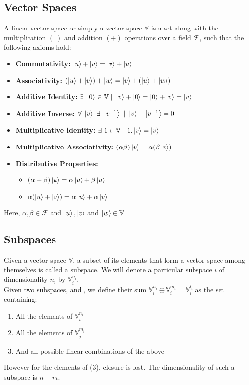 \subsection{Vector Spaces}
A linear vector space or simply a vector space $\mathbb{V}$ is a set along with the multiplication $(.)$ and addition $(+)$ operations over a field $\mathcal{F}$, such that the following axioms hold:
\begin{itemize}
	\item \textbf{Commutativity:} $\ket{u} + \ket{v} = \ket{v} + \ket{u}$
	\item \textbf{Associativity:} $(\ket{u} + \ket{v}) + \ket{w} = \ket{v} + (\ket{u} + \ket{w})$
	\item \textbf{Additive Identity:} 
	$\exists \  \ket{0} \in \mathbb{V} \ | \ \ket{v} + \ket{0} = \ket{0} + \ket{v} = \ket{v}$
	\item \textbf{Additive Inverse:} $\forall \ \ket{v} \ \exists \ \ket{v^{-1}} \ | \ \ket{v} + \ket{v^{-1}} = 0$
	\item \textbf{Multiplicative identity:} $\exists \ 1 \in \mathbb{V} \ | \ 1 .\ket{v} = \ket{v}$
	\item \textbf{Multiplicative Associativity:}  $(\alpha \beta) \ket{v} = \alpha (\beta \ket{v})$
	\item \textbf{Distributive Properties:} 
	\begin{itemize}
		\item $(\alpha + \beta) \ket{u} = \alpha \ket{u} + \beta \ket{u}$
		\item $\alpha (\ket{u} + \ket{v}) = \alpha \ket{u} + \alpha \ket{v}$
	\end{itemize}
\end{itemize}
Here, $\alpha , \beta \in \mathcal{F}$ and $\ket{u}, \ket{v} $ and $\ket{w} \in \mathbb{V}$
\subsection{Subspaces}
Given a vector space $\mathbb{V}$, a subset of its elements that form a vector space among themselves is called a subspace. We will denote a particular subspace $i$ of dimensionality $n_{i}$ by $\mathbb{V}^{n_{i}}_{i}$.\\
   Given two subspaces, and , we define their sum $\mathbb{V}^{n_{i}}_{i} \oplus \mathbb{V}^{m_{i}}_{i} = \mathbb{V}^{l_{i}}_{i}$ as the set containing:
\begin{enumerate}
\item All the elements of $\mathbb{V}^{n_{i}}_{i}$
\item All the elements of $\mathbb{V}^{m_{j}}_{j}$
\item And all possible linear combinations of the above
\end{enumerate} 
However for the elements of (3), closure is lost. The dimensionality of such a subspace is $n + m$.
